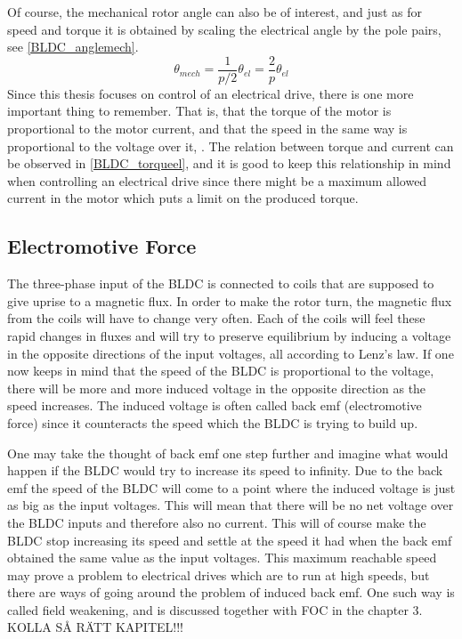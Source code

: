 \documentclass{LTHthesis}
\begin{document}
Of course, the mechanical rotor angle can also be of interest, and just as for speed and torque it is obtained by scaling the electrical angle by the pole pairs, see \eqref{BLDC_anglemech}.
\begin{equation} \label{BLDC_anglemech}
\theta_{mech}=\frac{1}{p/2}\theta_{el}=\frac{2}{p}\theta_{el}
\end{equation}
Since this thesis focuses on control of an electrical drive, there is one more important thing to remember. That is, that the torque of the motor is proportional to the motor current, and that the speed in the same way is proportional to the voltage over it, \cite{ala_kar2014}. The relation between torque and current can be observed in \eqref{BLDC_torqueel}, and it is good to keep this relationship in mind when controlling an electrical drive since there might be a maximum allowed current in the motor which puts a limit on the produced torque.

\subsection{Electromotive Force}
The three-phase input of the BLDC is connected to coils that are supposed to give uprise to a magnetic flux. In order to make the rotor turn, the magnetic flux from the coils will have to change very often. Each of the coils will feel these rapid changes in fluxes and will try to preserve equilibrium by inducing a voltage in the opposite directions of the input voltages, all according to Lenz's law. If one now keeps in mind that the speed of the BLDC is proportional to the voltage, there will be more and more induced voltage in the opposite direction as the speed increases. The induced voltage is often called back emf (electromotive force) since it counteracts the speed which the BLDC is trying to build up.

One may take the thought of back emf one step further and imagine what would happen if the BLDC would try to increase its speed to infinity. Due to the back emf the speed of the BLDC will come to a point where the induced voltage is just as big as the input voltages. This will mean that there will be no net voltage over the BLDC inputs and therefore also no current. This will of course make the BLDC stop increasing its speed and settle at the speed it had when the back emf obtained the same value as the input voltages. This maximum reachable speed may prove a problem to electrical drives which are to run at high speeds, but there are ways of going around the problem of induced back emf. One such way is called field weakening, and is discussed together with FOC in the chapter 3. KOLLA SÅ RÄTT KAPITEL!!!
\end{document}
